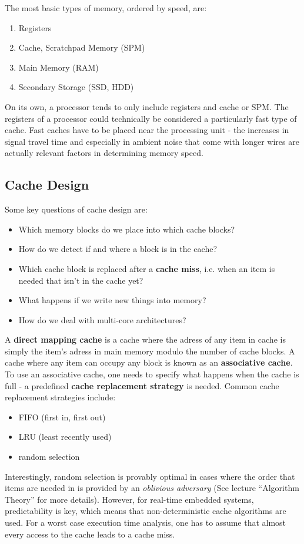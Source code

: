 \documentclass{report}
\newcommand{\tbf}{\textbf}
\newcommand*{\newpar}{\par\vspace{\baselineskip}\noindent} %
\begin{document}
\newpar
The most basic types of memory, ordered by speed, are:
\begin{enumerate}
 \item Registers
 \item Cache, Scratchpad Memory (SPM)
 \item Main Memory (RAM)
 \item Secondary Storage (SSD, HDD)
\end{enumerate}
On its own, a processor tends to only include registers and cache or SPM. The registers of a processor could technically be considered a particularly fast type of cache. Fast caches have to be placed near the processing unit - the increases in signal travel time and especially in ambient noise that come with longer wires are actually relevant factors in determining memory speed.
%
\subsection{Cache Design}
Some key questions of cache design are:
\begin{itemize}
 \item Which memory blocks do we place into which cache blocks?
 \item How do we detect if and where a block is in the cache?
 \item Which cache block is replaced after a \tbf{cache miss}, i.e. when an item is needed that isn't in the cache yet?
 \item What happens if we write new things into memory?
 \item How do we deal with multi-core architectures?
\end{itemize}
A \tbf{direct mapping cache} is a cache where the adress of any item in cache is simply the item's adress in main memory modulo the number of cache blocks. A cache where any item can occupy any block is known as an \tbf{associative cache}. To use an associative cache, one needs to specify what happens when the cache is full - a predefined \tbf{cache replacement strategy} is needed. Common cache replacement strategies include:
\begin{itemize}
 \item FIFO (first in, first out)
 \item LRU (least recently used)
 \item random selection
\end{itemize}
Interestingly, random selection is provably optimal in cases where the order that items are needed in is provided by an \textit{oblivious adversary} (See lecture ``Algorithm Theory'' for more details). However, for real-time embedded systems, predictability is key, which means that non-deterministic cache algorithms are used. For a worst case execution time analysis, one has to assume that almost every access to the cache leads to a cache miss.
%
\end{document}
